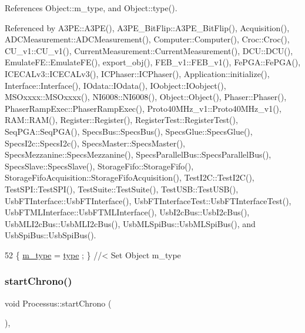 References Object\+::m\+\_\+type, and Object\+::type().



Referenced by A3\+P\+E\+::\+A3\+P\+E(), A3\+P\+E\+\_\+\+Bit\+Flip\+::\+A3\+P\+E\+\_\+\+Bit\+Flip(), Acquisition(), A\+D\+C\+Measurement\+::\+A\+D\+C\+Measurement(), Computer\+::\+Computer(), Croc\+::\+Croc(), C\+U\+\_\+v1\+::\+C\+U\+\_\+v1(), Current\+Measurement\+::\+Current\+Measurement(), D\+C\+U\+::\+D\+C\+U(), Emulate\+F\+E\+::\+Emulate\+F\+E(), export\+\_\+obj(), F\+E\+B\+\_\+v1\+::\+F\+E\+B\+\_\+v1(), Fe\+P\+G\+A\+::\+Fe\+P\+G\+A(), I\+C\+E\+C\+A\+Lv3\+::\+I\+C\+E\+C\+A\+Lv3(), I\+C\+Phaser\+::\+I\+C\+Phaser(), Application\+::initialize(), Interface\+::\+Interface(), I\+Odata\+::\+I\+Odata(), I\+Oobject\+::\+I\+Oobject(), M\+S\+Oxxxx\+::\+M\+S\+Oxxxx(), N\+I6008\+::\+N\+I6008(), Object\+::\+Object(), Phaser\+::\+Phaser(), Phaser\+Ramp\+Exec\+::\+Phaser\+Ramp\+Exec(), Proto40\+M\+Hz\+\_\+v1\+::\+Proto40\+M\+Hz\+\_\+v1(), R\+A\+M\+::\+R\+A\+M(), Register\+::\+Register(), Register\+Test\+::\+Register\+Test(), Seq\+P\+G\+A\+::\+Seq\+P\+G\+A(), Specs\+Bus\+::\+Specs\+Bus(), Specs\+Glue\+::\+Specs\+Glue(), Specs\+I2c\+::\+Specs\+I2c(), Specs\+Master\+::\+Specs\+Master(), Specs\+Mezzanine\+::\+Specs\+Mezzanine(), Specs\+Parallel\+Bus\+::\+Specs\+Parallel\+Bus(), Specs\+Slave\+::\+Specs\+Slave(), Storage\+Fifo\+::\+Storage\+Fifo(), Storage\+Fifo\+Acquisition\+::\+Storage\+Fifo\+Acquisition(), Test\+I2\+C\+::\+Test\+I2\+C(), Test\+S\+P\+I\+::\+Test\+S\+P\+I(), Test\+Suite\+::\+Test\+Suite(), Test\+U\+S\+B\+::\+Test\+U\+S\+B(), Usb\+F\+T\+Interface\+::\+Usb\+F\+T\+Interface(), Usb\+F\+T\+Interface\+Test\+::\+Usb\+F\+T\+Interface\+Test(), Usb\+F\+T\+M\+L\+Interface\+::\+Usb\+F\+T\+M\+L\+Interface(), Usb\+I2c\+Bus\+::\+Usb\+I2c\+Bus(), Usb\+M\+L\+I2c\+Bus\+::\+Usb\+M\+L\+I2c\+Bus(), Usb\+M\+L\+Spi\+Bus\+::\+Usb\+M\+L\+Spi\+Bus(), and Usb\+Spi\+Bus\+::\+Usb\+Spi\+Bus().


\begin{DoxyCode}
52 \{ \hyperlink{classObject_a457a600fe8c00eb1034374f75110a78c}{m\_type}  = \hyperlink{classObject_a84f99f70f144a83e1582d1d0f84e4e62}{type}  ; \} \textcolor{comment}{//< Set Object m\_type}
\end{DoxyCode}
\mbox{\label{classProcessus_a5e4d34b86241fa0756e07375a14ff4b2}} 
\subsubsection{\texorpdfstring{start\+Chrono()}{startChrono()}}
{\footnotesize\ttfamily void Processus\+::start\+Chrono (\begin{DoxyParamCaption}{ }\end{DoxyParamCaption})\hspace{0.3cm}{\ttfamily [inline]}, {\ttfamily [inherited]}}

